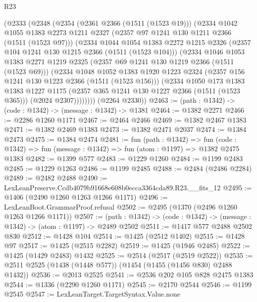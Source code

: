 \begin{lexlean}{R23}
\begin{coremodule}
    (@2333
      (@2348
        (@2354
          (@2361 @2366 (@1511 (@1523 @19)))
          (@2334
            @1042
            @1055
            @1383
            @2273
            @1211
            @2327
            (@2357 @97 @1241 @130 @1211 @2366 (@1511 (@1523 @97)))
            (@2334
              @1044
              @1054
              @1383
              @2272
              @1215
              @2326
              (@2357 @104 @1241 @130 @1215 @2366 (@1511 (@1523 @104)))
              (@2334
                @1046
                @1053
                @1383
                @2271
                @1219
                @2325
                (@2357 @69 @1241 @130 @1219 @2366 (@1511 (@1523 @69)))
                (@2334
                  @1048
                  @1052
                  @1383
                  @1920
                  @1223
                  @2324
                  (@2357 @156 @1241 @130 @1223 @2366 (@1511 (@1523 @156)))
                  (@2334
                    @1050
                    @173
                    @1383
                    @1383
                    @1227
                    @1175
                    (@2357 @365 @1241 @130 @1227 @2366 (@1511 (@1523 @365)))
                    (@2024 @2307))))))))
      (@2264 @2330))
@2463 := (path : @1342) -> (code : @1342) -> (message : @1342) -> @1381
@2464 := @1382 @2271
@2466 := @2286 @1260 @1171
@2467 := @2464 @2466
@2469 := @1382 @2467 @1383
@2471 := @1382 @2469 @1383
@2473 := @1382 @2471 @2037
@2474 := @1384 @2473
@2475 := @1384 @2474
@2481 := fun (path : @1342) =>
  fun (code : @1342) => fun (message : @1342) => fun (atom : @1197) => @1382 @2475 @1383
@2482 := @1399 @577
@2483 := @1229 @1260
@2484 := @1199 @2483
@2485 := @1229 @1263
@2486 := @1199 @2485
@2488 := @2484 (@2486 @2284)
@2489 := @2482 @2488
@2490 := LexLeanPreserve.Ccdb4079b91668e608b0ecca3364cda89.R23.__fits_12
@2495 := @1406 (@2490 @1260 @1263 @1266 @1171)
@2496 := LexLeanBoot.GrammarProof.refusal
@2502 := @2495 (@1370 (@2496 @1260 @1263 @1266 @1171))
@2507 := (path : @1342) -> (code : @1342) -> (message : @1342) -> (atom : @1197) -> @2489 @2502
@2511 := @1417 @577 @2488 @2502 @830
@2512 := @1428 @104
@2514 := @1425 (@2512 @1402)
@2515 := @1428 @97
@2517 := @1425 (@2515 @2282)
@2519 := @1425 (@1946 @2485)
@2522 := @1425 (@1429 @2483) @1432
@2525 := @2514 (@2517 (@2519 @2522))
@2535 := @2511 @2525 (@1438 (@1448 @577)) (@1454 (@1455 (@1456 @830) @2488 @1432))
@2536 := @2013 @2525
@2541 := @2536 @202 @105 @828 @2475 @1383
@2544 := @1336 (@2290 @1260 @1171)
@2545 := @2170 @2544
@2546 := @1199 @2545
@2547 := LexLeanTarget.TargetSyntax.Value.none

\end{coremodule}
\end{lexlean}
